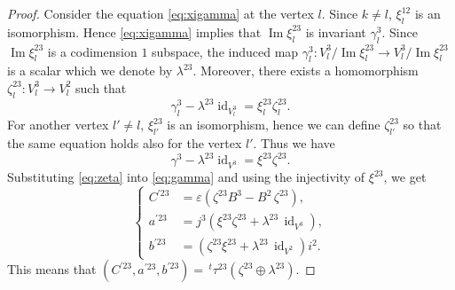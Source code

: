 \documentclass[12pt]{amsart}
\theoremstyle{definition}
\theoremstyle{remark}
\numberwithin{equation}{subsection}
\newcommand{\lsp}[2]{\,{}^{#1}{#2}}
\newcommand{\Ima}{\operatorname{Im}}
\newcommand{\id}{\operatorname{id}}
\begin{document}
\begin{proof}
Consider the equation \eqref{eq:xigamma} at the vertex $l$. Since
$k\neq l$, $\xi^{12}_l$ is an isomorphism. Hence \eqref{eq:xigamma}
implies that $\Ima\xi^{23}_l$ is invariant $\gamma^3_l$. 
Since $\Ima\xi^{23}_l$ is a codimension $1$ subspace,
the induced map $\gamma^3_l\colon
V^3_l/\Ima\xi^{23}_l \to V^3_l/\Ima\xi^{23}_l$ is a scalar which we
denote by $\lambda^{23}$. Moreover, there
exists a homomorphism
$\zeta^{23}_l\colon V^3_l \to V^2_l$ such that
\[
  \gamma^3_l - \lambda^{23}\id_{V^3_l} = \xi^{23}_l \zeta^{23}_l.
\]   
For another vertex $l'\neq l$, $\xi^{23}_{l'}$ is an isomorphism, hence we
can define $\zeta^{23}_{l'}$ so that the same equation holds also for
the vertex $l'$. Thus we have
\begin{equation}
\label{eq:zeta}
  \gamma^3 - \lambda^{23}\id_{V^3} = \xi^{23} \zeta^{23}.
\end{equation}
Substituting \eqref{eq:zeta} into \eqref{eq:gamma} and using the
injectivity of $\xi^{23}$, we get
\begin{equation*}
\left\{\begin{split}
        C^{\prime 23} &= 
        \varepsilon (\zeta^{23}B^3 - B^2 \,\zeta^{23}), \\
        a^{\prime 23} &= j^3  (\xi^{23}\zeta^{23} +
                \lambda^{23}\,\id_{V^3}),\\
        b^{\prime 23} &= (\zeta^{23}\xi^{23} 
                  + \lambda^{23}\,\id_{V^2}) i^2.
\end{split}\right.
\end{equation*}
This means that
\(
(C^{\prime 23}, a^{\prime 23}, b^{\prime 23})
= \lsp{t}{\tau^{23}}(\zeta^{23}\oplus\lambda^{23})
\).


\end{proof}
\end{document}
